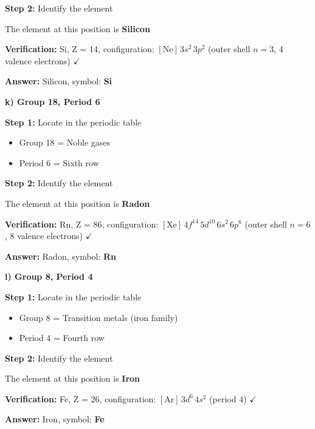 \begin{exercise}
\begin{solu}
        \textbf{Step 2:} Identify the element

        The element at this position is \textbf{Silicon}

        \textbf{Verification:} Si, Z = 14, configuration: \([\text{Ne}] \, 3s^2 \, 3p^2\) (outer shell \(n = 3\), 4 valence electrons) \(\checkmark\)

        \textbf{Answer:} Silicon, symbol: \textbf{Si}

        \textbf{k) Group 18, Period 6}

        \textbf{Step 1:} Locate in the periodic table
        \begin{itemize}
            \item Group 18 = Noble gases
            \item Period 6 = Sixth row
        \end{itemize}

        \textbf{Step 2:} Identify the element

        The element at this position is \textbf{Radon}

        \textbf{Verification:} Rn, Z = 86, configuration: \([\text{Xe}] \, 4f^{14} \, 5d^{10} \, 6s^2 \, 6p^6\) (outer shell \(n = 6\), 8 valence electrons) \(\checkmark\)

        \textbf{Answer:} Radon, symbol: \textbf{Rn}

        \textbf{l) Group 8, Period 4}

        \textbf{Step 1:} Locate in the periodic table
        \begin{itemize}
            \item Group 8 = Transition metals (iron family)
            \item Period 4 = Fourth row
        \end{itemize}

        \textbf{Step 2:} Identify the element

        The element at this position is \textbf{Iron}

        \textbf{Verification:} Fe, Z = 26, configuration: \([\text{Ar}] \, 3d^6 \, 4s^2\) (period 4) \(\checkmark\)

        \textbf{Answer:} Iron, symbol: \textbf{Fe}


\end{solu}
\end{exercise}
